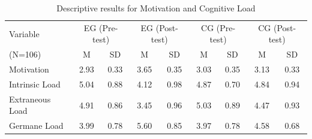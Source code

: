 

\begin{table}[htbp]
\centering
\caption{Descriptive results for Motivation and Cognitive Load}
\label{tab:descriptive}
\setlength{\aboverulesep}{0pt}
\setlength{\belowrulesep}{0pt}
\begin{tabular}{|lcccccccc|}
\hline
\rowcolor{gray!50} Variable & \multicolumn{2}{c}{EG (Pre-test)} & \multicolumn{2}{c}{EG (Post-test)} & \multicolumn{2}{c}{CG (Pre-test)} & \multicolumn{2}{c}{CG (Post-test)} \\
\rowcolor{gray!50} (N=106) & M & SD & M & SD & M & SD & M & SD \\
\hline
Motivation & 2.93 & 0.33 & 3.65 & 0.35 & 3.03 & 0.35 & 3.13 & 0.33 \\
\rowcolor{gray!15} Intrinsic Load & 5.04 & 0.88 & 4.12 & 0.98 & 4.87 & 0.70 & 4.84 & 0.94 \\
Extraneous Load & 4.91 & 0.86 & 3.45 & 0.96 & 5.03 & 0.89 & 4.47 & 0.93 \\
\rowcolor{gray!15} Germane Load & 3.99 & 0.78 & 5.60 & 0.85 & 3.97 & 0.78 & 4.58 & 0.68 \\
\hline
\end{tabular}
\end{table}

